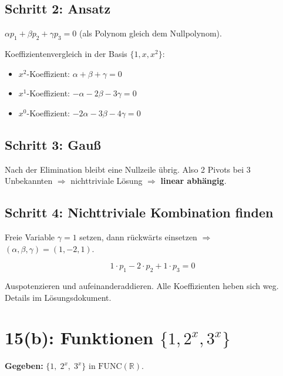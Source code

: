 \documentclass[a4paper,12pt]{article}
\begin{document}
\subsection*{Schritt 2: Ansatz}

$\alpha p_1 + \beta p_2 + \gamma p_3 = 0$ (als Polynom gleich dem Nullpolynom).

Koeffizientenvergleich in der Basis $\{1, x, x^2\}$:
\begin{itemize}[nosep]
    \item $x^2$-Koeffizient: $\alpha + \beta + \gamma = 0$
    \item $x^1$-Koeffizient: $-\alpha - 2\beta - 3\gamma = 0$
    \item $x^0$-Koeffizient: $-2\alpha - 3\beta - 4\gamma = 0$
\end{itemize}

\subsection*{Schritt 3: Gau\ss{}}

Nach der Elimination bleibt eine Nullzeile \"ubrig. Also 2 Pivots bei 3 Unbekannten $\Rightarrow$ nichttriviale L\"osung $\Rightarrow$ \textbf{linear abh\"angig}.

\subsection*{Schritt 4: Nichttriviale Kombination finden}

Freie Variable $\gamma = 1$ setzen, dann r\"uckw\"arts einsetzen $\Rightarrow$ $(\alpha, \beta, \gamma) = (1, -2, 1)$.

\[
\boxed{1 \cdot p_1 - 2 \cdot p_2 + 1 \cdot p_3 = 0}
\]

\begin{merkbox}[title={Sanity-Check}]
Auspotenzieren und aufeinanderaddieren. Alle Koeffizienten heben sich weg. Details im L\"osungsdokument.
\end{merkbox}

\bigskip

\section*{15(b): Funktionen $\{1, 2^x, 3^x\}$}

\textbf{Gegeben:} $\{1,\; 2^x,\; 3^x\}$ in $\text{FUNC}(\mathbb{R})$.
\end{document}
